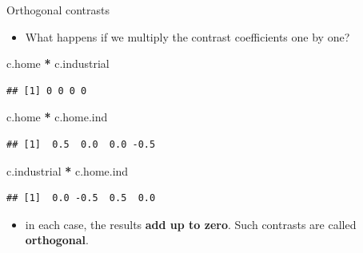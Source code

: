 \documentclass[ignorenonframetext,]{beamer}
\newenvironment{Shaded}{\begin{snugshade}}{\end{snugshade}}
\newcommand{\NormalTok}[1]{#1}
\newcommand{\OperatorTok}[1]{\textcolor[rgb]{0.81,0.36,0.00}{\textbf{#1}}}
\newcommand{\StringTok}[1]{\textcolor[rgb]{0.31,0.60,0.02}{#1}}
\providecommand{\tightlist}{%
  \setlength{\itemsep}{0pt}\setlength{\parskip}{0pt}}
\begin{document}
\begin{frame}[fragile]{Orthogonal contrasts}
\protect\hypertarget{orthogonal-contrasts}{}

\begin{itemize}
\tightlist
\item
  What happens if we multiply the contrast coefficients one by one?
\end{itemize}

\begin{Shaded}
\begin{Highlighting}[]
\NormalTok{c.home }\OperatorTok{*}\StringTok{ }\NormalTok{c.industrial}
\end{Highlighting}
\end{Shaded}

\begin{verbatim}
## [1] 0 0 0 0
\end{verbatim}

\begin{Shaded}
\begin{Highlighting}[]
\NormalTok{c.home }\OperatorTok{*}\StringTok{ }\NormalTok{c.home.ind}
\end{Highlighting}
\end{Shaded}

\begin{verbatim}
## [1]  0.5  0.0  0.0 -0.5
\end{verbatim}

\begin{Shaded}
\begin{Highlighting}[]
\NormalTok{c.industrial }\OperatorTok{*}\StringTok{ }\NormalTok{c.home.ind}
\end{Highlighting}
\end{Shaded}

\begin{verbatim}
## [1]  0.0 -0.5  0.5  0.0
\end{verbatim}

\begin{itemize}
\tightlist
\item
  in each case, the results \textbf{add up to zero}. Such contrasts are
  called \textbf{orthogonal}.
\end{itemize}

\end{frame}
\end{document}
